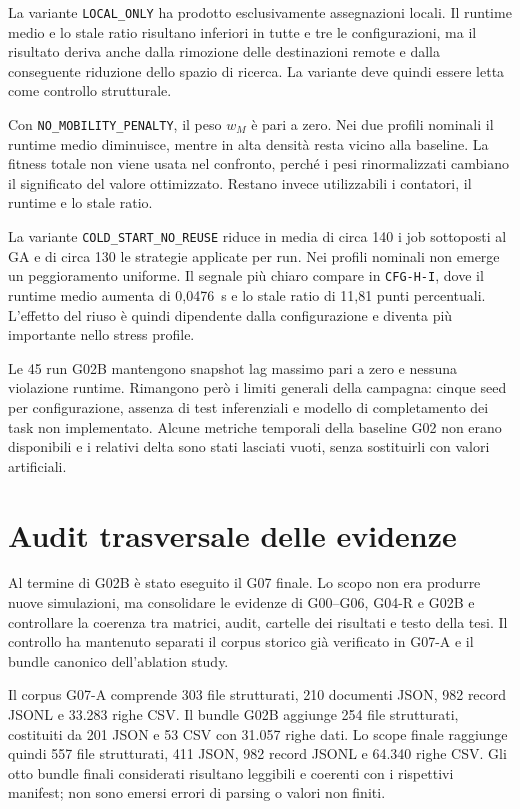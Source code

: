 La variante \texttt{LOCAL\_ONLY} ha prodotto esclusivamente assegnazioni locali. Il runtime medio e lo stale ratio risultano inferiori in tutte e tre le configurazioni, ma il risultato deriva anche dalla rimozione delle destinazioni remote e dalla conseguente riduzione dello spazio di ricerca. La variante deve quindi essere letta come controllo strutturale.

Con \texttt{NO\_MOBILITY\_PENALTY}, il peso $w_M$ è pari a zero. Nei due profili nominali il runtime medio diminuisce, mentre in alta densità resta vicino alla baseline. La fitness totale non viene usata nel confronto, perché i pesi rinormalizzati cambiano il significato del valore ottimizzato. Restano invece utilizzabili i contatori, il runtime e lo stale ratio.

La variante \texttt{COLD\_START\_NO\_REUSE} riduce in media di circa 140 i job sottoposti al GA e di circa 130 le strategie applicate per run. Nei profili nominali non emerge un peggioramento uniforme. Il segnale più chiaro compare in \texttt{CFG-H-I}, dove il runtime medio aumenta di 0,0476~s e lo stale ratio di 11,81 punti percentuali. L'effetto del riuso è quindi dipendente dalla configurazione e diventa più importante nello stress profile.

Le 45 run G02B mantengono snapshot lag massimo pari a zero e nessuna violazione runtime. Rimangono però i limiti generali della campagna: cinque seed per configurazione, assenza di test inferenziali e modello di completamento dei task non implementato. Alcune metriche temporali della baseline G02 non erano disponibili e i relativi delta sono stati lasciati vuoti, senza sostituirli con valori artificiali.

\section{Audit trasversale delle evidenze}
\label{sec:exp_audit}

Al termine di G02B è stato eseguito il G07 finale. Lo scopo non era produrre nuove simulazioni, ma consolidare le evidenze di G00--G06, G04-R e G02B e controllare la coerenza tra matrici, audit, cartelle dei risultati e testo della tesi. Il controllo ha mantenuto separati il corpus storico già verificato in G07-A e il bundle canonico dell'ablation study.

Il corpus G07-A comprende 303 file strutturati, 210 documenti JSON, 982 record JSONL e 33.283 righe CSV. Il bundle G02B aggiunge 254 file strutturati, costituiti da 201 JSON e 53 CSV con 31.057 righe dati. Lo scope finale raggiunge quindi 557 file strutturati, 411 JSON, 982 record JSONL e 64.340 righe CSV. Gli otto bundle finali considerati risultano leggibili e coerenti con i rispettivi manifest; non sono emersi errori di parsing o valori non finiti.

